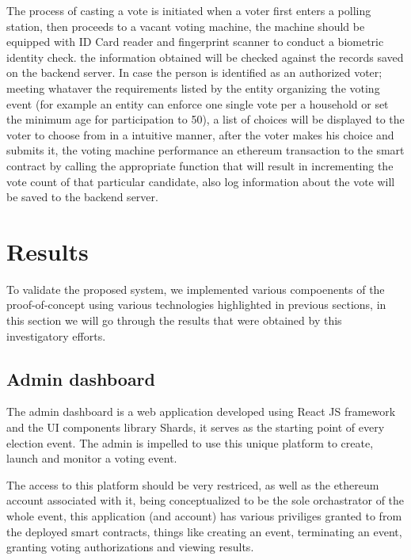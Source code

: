 The process of casting a vote is initiated when a voter first enters a polling station, then proceeds to a vacant voting machine, the machine should be equipped with ID Card reader and fingerprint scanner to conduct a biometric identity check. the information obtained will be checked against the records saved on the backend server. In case the person is identified as an authorized voter; meeting whataver the requirements listed by the entity organizing the voting event (for example an entity can enforce one single vote per a household or set the minimum age for participation to 50), a list of choices will be displayed to the voter to choose from in a intuitive manner, after the voter makes his choice and submits it, the voting machine performance an ethereum transaction to the smart contract by calling the appropriate function that will result in incrementing the vote count of that particular candidate, also log information about the vote will be saved to the backend server.

\section{Results}

To validate the proposed system, we implemented various compoenents of the proof-of-concept using various technologies highlighted in previous sections, in this section we will go through the results that were obtained by this investigatory efforts.

\subsection{Admin dashboard}

The admin dashboard is a web application developed using React JS framework and the UI components library Shards\cite{ShardsReact}, it serves as the starting point of every election event. The admin is impelled to use this unique platform to create, launch and monitor a voting event.

The access to this platform should be very restriced, as well as the ethereum account associated with it, being conceptualized to be the sole orchastrator of the whole event, this application (and account) has various priviliges granted to from the deployed smart contracts, things like creating an event, terminating an event, granting voting authorizations and viewing results.

